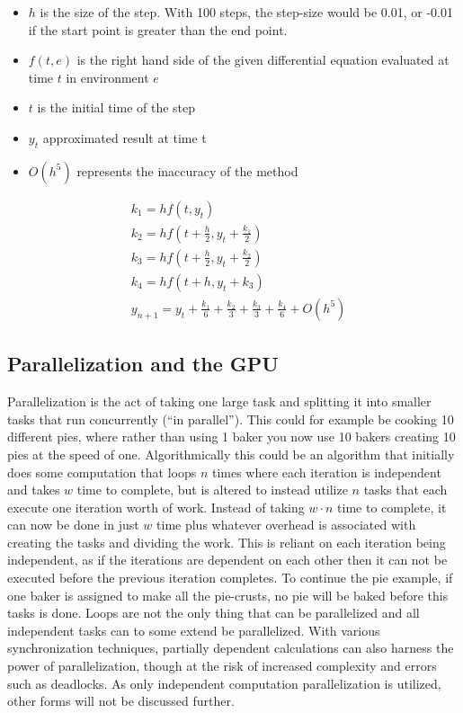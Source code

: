 \begin{itemize}
\item $h$ is the size of the step. With 100 steps, the step-size would be 0.01, or -0.01 if the start point is greater than the end point.
\item $f(t, e)$  is the right hand side of the given differential equation evaluated at time $t$ in environment $e$
\item $t$ is the initial time of the step
\item $y_t$ approximated result at time t
\item $O(h^5)$ represents the inaccuracy of the method
\end{itemize}

\begin{equation}\begin{aligned}\label{eq:rk4}
&k_1 = h f(t, y_t)\\
&k_2 = h f(t + \frac{h}{2}, y_t + \frac{k_1}{2})\\
&k_3 = h f(t + \frac{h}{2}, y_t + \frac{k_2}{2})\\
&k_4 = h f(t + h, y_t + k_3)\\
&y_{n+1} = y_t + \frac{k_1}{6} + \frac{k_2}{3} + \frac{k_3}{3} + \frac{k_4}{6} + O(h^5)
\end{aligned}\end{equation}


\subsection{Parallelization and the GPU}\label{subsec:background:parallelization}
Parallelization is the act of taking one large task and splitting it into smaller tasks that run concurrently (``in parallel'').
This could for example be cooking 10 different pies, where rather than using 1 baker you now use 10 bakers creating 10 pies at the speed of one.
Algorithmically this could be an algorithm that initially does some computation that loops $n$ times where each iteration is independent and takes $w$ time to complete, but is altered to instead utilize $n$ tasks that each execute one iteration worth of work.
Instead of taking $w \cdot n$ time to complete, it can now be done in just $w$ time plus whatever overhead is associated with creating the tasks and dividing the work.
This is reliant on each iteration being independent, as if the iterations are dependent on each other then it can not be executed before the previous iteration completes.
To continue the pie example, if one baker is assigned to make all the pie-crusts, no pie will be baked before this tasks is done.
Loops are not the only thing that can be parallelized and all independent tasks can to some extend be parallelized. 
With various synchronization techniques, partially dependent calculations can also harness the power of parallelization, though at the risk of increased complexity and errors such as deadlocks.
As only independent computation parallelization is utilized, other forms will not be discussed further.

